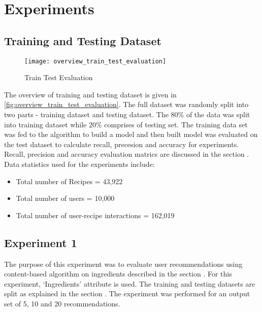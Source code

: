\section{Experiments}

\subsection{Training and Testing Dataset}
\label{sec:traintest}
\begin{singlespace}
\begin{figure}[H]
	\centering
	\texttt{[image: overview\_train\_test\_evaluation]}
	\caption{Train Test Evaluation }
	\label{fig:overview_train_test_evaluation}
\end{figure}  
\end{singlespace}
The overview of training and testing dataset is given in \autoref{fig:overview_train_test_evaluation}. The full dataset was randomly split into
two parts - training dataset and testing dataset. The 80\% of the data was split into training dataset while 20\% comprises of testing set.  
The training data set was fed to the algorithm to build a model and then built model was evaluated on the test dataset to calculate recall, precesion and accuracy for experiments. Recall, precision and accuracy evaluation matrics are discussed in the section . \\
Data statistics used for the experiments include:\\
\begin{itemize}
\item Total number of Recipes = 43,922
\item Total number of users = 10,000
\item Total number of user-recipe interactions = 162,019
\end{itemize}



\subsection{Experiment 1}
\label{sec:cb_ingred_exp}
The purpose of this experiment was to evaluate user recommendations using content-based algorithm on ingredients described in the section . For this experiment, \lq{}Ingredients\rq{} attribute is used. The training and testing datasets are split as explained in the section . The experiment was performed for an output set of 5, 10 and 20 recommendations. 

